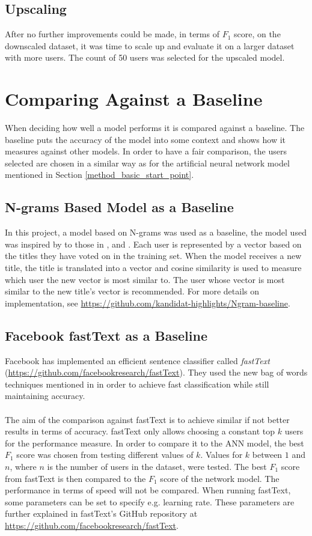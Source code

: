 \subsection{Upscaling}
After no further improvements could be made, in terms of $F_1$ score, on the downscaled dataset, it was time to scale up and evaluate it on a larger dataset with more users. The count of 50 users was selected for the upscaled model. 

\section{Comparing Against a Baseline}
When deciding how well a model performs it is compared against a baseline. The baseline puts the accuracy of the model into some context and shows how it measures against other models. In order to have a fair comparison, the users selected are chosen in a similar way as for the artificial neural network model mentioned in Section \ref{method_basic_start_point}. 

\subsection{N-grams Based Model as a Baseline}
In this project, a model based on N-grams \parencite{cavnar1994n} was used as a baseline, the model used was inspired by to those in \parencite{miao2005document}, and \parencite{khabiacluster}. Each user is represented by a vector based on the titles they have voted on in the training set. When the model receives a new title, the title is translated into a vector and cosine similarity \parencite{steinbach2000comparison} is used to measure which user the new vector is most similar to. The user whose vector is most similar to the new title's vector is recommended. For more details on implementation, see \url{https://github.com/kandidat-highlights/Ngram-baseline}.

\subsection{Facebook fastText as a Baseline}\label{method:fasttext}
Facebook has implemented an efficient sentence classifier called \textit{fastText} (\url{https://github.com/facebookresearch/fastText}). They used the new bag of words techniques mentioned in \parencite{joulin2016bag} in order to achieve fast classification while still maintaining accuracy.
\\\\
The aim of the comparison against fastText is to achieve similar if not better results in terms of accuracy. fastText only allows choosing a constant top $k$ users for the performance measure. In order to compare it to the ANN model, the best $F_1$ score was chosen from testing different values of $k$. Values for $k$ between $1$ and $n$, where $n$ is the number of users in the dataset, were tested. The best $F_1$ score from fastText is then compared to the $F_1$ score of the network model.
The performance in terms of speed will not be compared. When running fastText, some parameters can be set to specify e.g. learning rate. These parameters are further explained in fastText's GitHub repository at \url{https://github.com/facebookresearch/fastText}.